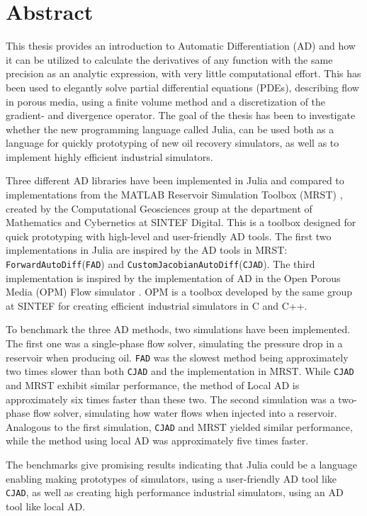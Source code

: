 \chapter*{Abstract}
This thesis provides an introduction to Automatic Differentiation (AD) and how it can be utilized to calculate the derivatives of any function with the same precision as an analytic expression, with very little computational effort. This has been used to elegantly solve partial differential equations (PDEs), describing flow in porous media, using a finite volume method and a discretization of the gradient- and divergence operator. The goal of the thesis has been to investigate whether the new programming language called Julia, can be used both as a language for quickly prototyping of new oil recovery simulators, as well as to implement highly efficient industrial simulators.

Three different AD libraries have been implemented in Julia and compared to implementations from the MATLAB Reservoir Simulation Toolbox (MRST) \emph{\citep{mrstHomepage}}, created by the Computational Geosciences  group  at  the  department  of  Mathematics  and  Cybernetics  at  SINTEF Digital. This is a toolbox designed for quick prototyping with high-level and user-friendly AD tools. The first two implementations in Julia are inspired by the AD tools in MRST: \texttt{ForwardAutoDiff}(\texttt{FAD}) and \texttt{CustomJacobianAutoDiff}(\texttt{CJAD}). The third implementation is inspired by the implementation of AD in the Open Porous Media (OPM) Flow simulator \emph{\citep{opm}}. OPM is a toolbox developed by the same group at SINTEF for creating efficient industrial simulators in C and C++. 

To benchmark the three AD methods, two simulations have been implemented. The first one was a single-phase flow solver, simulating the pressure drop in a reservoir when producing oil. \texttt{FAD} was the slowest method being approximately two times slower than both \texttt{CJAD} and the implementation in MRST. While \texttt{CJAD} and MRST exhibit similar performance, the method of Local AD is approximately six times faster than these two. The second simulation was a two-phase flow solver, simulating how water flows when injected into a reservoir. Analogous to the first simulation, \texttt{CJAD} and MRST yielded similar performance, while the method using local AD was approximately five times faster.

The benchmarks give promising results indicating that Julia could be a language enabling making prototypes of simulators, using a user-friendly AD tool like \texttt{CJAD}, as well as creating high performance industrial simulators, using an AD tool like local AD.